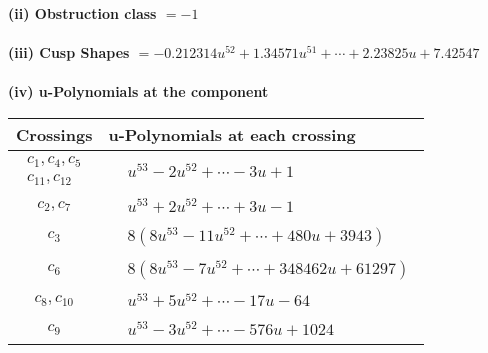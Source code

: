 \documentclass[1p]{elsarticle_modified}
\theoremstyle{definition}
\begin{document}
\flushleft \textbf{(ii) Obstruction class $= -1$}\\~\\
\flushleft \textbf{(iii) Cusp Shapes $= -0.212314 u^{52}+1.34571 u^{51}+\cdots+2.23825 u+7.42547$}\\~\\
\newpage\renewcommand{\arraystretch}{1}
\flushleft \textbf{(iv) u-Polynomials at the component}\newline \\
\begin{tabular}{m{50pt}|m{274pt}}
Crossings & \hspace{64pt}u-Polynomials at each crossing \\
\hline $$\begin{aligned}c_{1},c_{4},c_{5}\\c_{11},c_{12}\end{aligned}$$&$\begin{aligned}
&u^{53}-2 u^{52}+\cdots-3 u+1
\end{aligned}$\\
\hline $$\begin{aligned}c_{2},c_{7}\end{aligned}$$&$\begin{aligned}
&u^{53}+2 u^{52}+\cdots+3 u-1
\end{aligned}$\\
\hline $$\begin{aligned}c_{3}\end{aligned}$$&$\begin{aligned}
&8(8 u^{53}-11 u^{52}+\cdots+480 u+3943)
\end{aligned}$\\
\hline $$\begin{aligned}c_{6}\end{aligned}$$&$\begin{aligned}
&8(8 u^{53}-7 u^{52}+\cdots+348462 u+61297)
\end{aligned}$\\
\hline $$\begin{aligned}c_{8},c_{10}\end{aligned}$$&$\begin{aligned}
&u^{53}+5 u^{52}+\cdots-17 u-64
\end{aligned}$\\
\hline $$\begin{aligned}c_{9}\end{aligned}$$&$\begin{aligned}
&u^{53}-3 u^{52}+\cdots-576 u+1024
\end{aligned}$\\
\hline
\end{tabular}\\~\\
\end{document}
